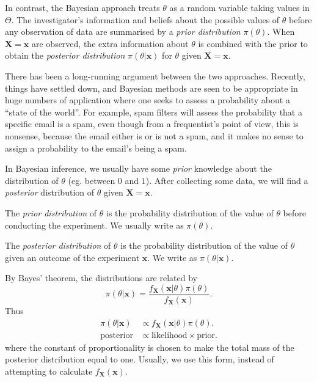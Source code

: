 \documentclass[a4paper]{article}
\begin{document}
In contrast, the Bayesian approach treats $\theta$ as a random variable taking values in $\Theta$. The investigator's information and beliefs about the possible values of $\theta$ before any observation of data are summarised by a \emph{prior distribution} $\pi(\theta)$. When $\mathbf{X} = \mathbf{x}$ are observed, the extra information about $\theta$ is combined with the prior to obtain the \emph{posterior distribution} $\pi(\theta|\mathbf{x})$ for $\theta$ given $\mathbf{X} = \mathbf{x}$.

There has been a long-running argument between the two approaches. Recently, things have settled down, and Bayesian methods are seen to be appropriate in huge numbers of application where one seeks to assess a probability about a ``state of the world''. For example, spam filters will assess the probability that a specific email is a spam, even though from a frequentist's point of view, this is nonsense, because the email either is or is not a spam, and it makes no sense to assign a probability to the email's being a spam.

In Bayesian inference, we usually have some \emph{prior} knowledge about the distribution of $\theta$ (eg. between $0$ and $1$). After collecting some data, we will find a \emph{posterior} distribution of $\theta$ given $\mathbf{X} = \mathbf{x}$.

\begin{defi}
  The \emph{prior distribution} of $\theta$ is the probability distribution of the value of $\theta$ before conducting the experiment. We usually write as $\pi(\theta)$.

  The \emph{posterior distribution} of $\theta$ is the probability distribution of the value of $\theta$ given an outcome of the experiment $\mathbf{x}$. We write as $\pi(\theta|\mathbf{x})$.
\end{defi}
By Bayes' theorem, the distributions are related by
\[
  \pi(\theta|\mathbf{x}) = \frac{f_{\mathbf{X}}(\mathbf{x}|\theta)\pi(\theta)}{f_{\mathbf{X}}(\mathbf{x})}.
\]
Thus
\begin{align*}
  \pi(\theta|\mathbf{x}) &\propto f_{\mathbf{X}}(\mathbf{x}|\theta)\pi(\theta).\\
  \text{posterior} &\propto \text{likelihood}\times\text{prior}.
\end{align*}
where the constant of proportionality is chosen to make the total mass of the posterior distribution equal to one. Usually, we use this form, instead of attempting to calculate $f_\mathbf{X}(\mathbf{x})$.
\end{document}
